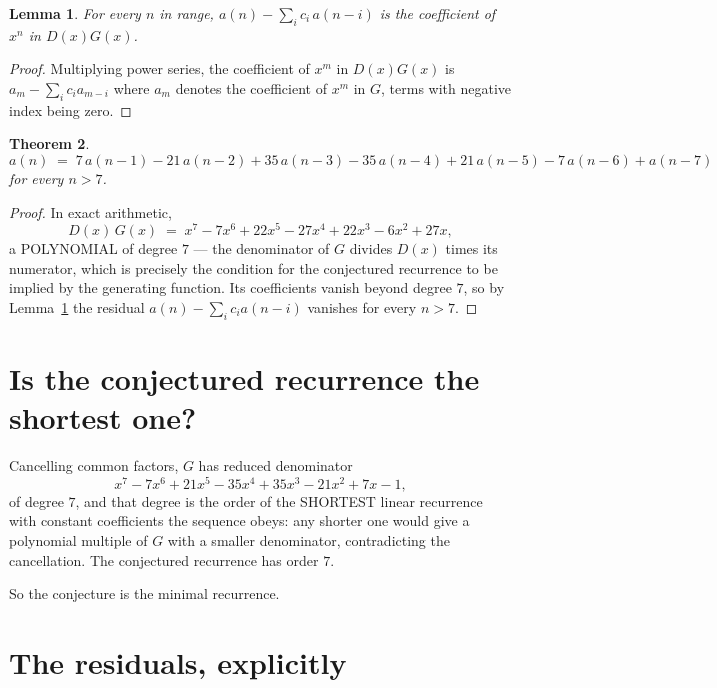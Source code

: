 \documentclass[11pt,a4paper]{article}
\theoremstyle{plain}
\newtheorem{theorem}{Theorem}
\newtheorem{lemma}[theorem]{Lemma}
\theoremstyle{definition}
\begin{document}
\begin{lemma}\label{lem:key}
For every $n$ in range, $a(n)-\sum_i c_i\,a(n-i)$ is the coefficient of $x^{n}$ in
$D(x)G(x)$.
\end{lemma}

\begin{proof}
Multiplying power series, the coefficient of $x^{m}$ in $D(x)G(x)$ is
$a_m-\sum_i c_i a_{m-i}$ where $a_m$ denotes the coefficient of $x^{m}$ in $G$, terms with
negative index being zero.
\end{proof}

\begin{theorem}
\[
a(n)\;=\;7\,a(n-1) - 21\,a(n-2) + 35\,a(n-3) - 35\,a(n-4) + 21\,a(n-5) - 7\,a(n-6) + a(n-7)
\]
for every $n>7$.
\end{theorem}

\begin{proof}
In exact arithmetic,
\[
D(x)\,G(x)\;=\;x^{7} - 7 x^{6} + 22 x^{5} - 27 x^{4} + 22 x^{3} - 6 x^{2} + 27 x,
\]
a POLYNOMIAL of degree $7$ --- the denominator of $G$ divides $D(x)$ times its numerator,
which is precisely the condition for the conjectured recurrence to be implied by the
generating function. Its coefficients vanish beyond degree $7$, so by
Lemma~\ref{lem:key} the residual $a(n)-\sum_ic_ia(n-i)$ vanishes for every
$n>7$.
\end{proof}

\section{Is the conjectured recurrence the shortest one?}

Cancelling common factors, $G$ has reduced denominator
\[
x^{7} - 7 x^{6} + 21 x^{5} - 35 x^{4} + 35 x^{3} - 21 x^{2} + 7 x - 1,
\]
of degree $7$, and that degree is the order of the SHORTEST linear recurrence with
constant coefficients the sequence obeys: any shorter one would give a polynomial multiple of
$G$ with a smaller denominator, contradicting the cancellation. The conjectured recurrence has
order $7$.

So the conjecture is the minimal recurrence.

\section{The residuals, explicitly}
\end{document}
